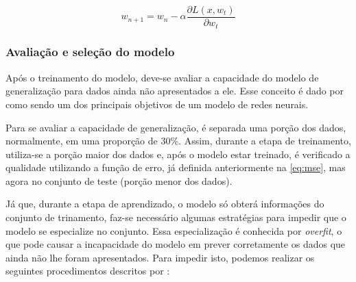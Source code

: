 \documentclass[
    12pt,
    oneside,
    a4paper,
    english,
    brazil
]{abntex2}
\begin{document}
\begin{equation}\label{eq:backpropagation}
    w_{n+1} = w_n - \alpha \frac{\partial L(x,w_t)}{\partial w_t}
\end{equation}

\subsubsection{Avaliação e seleção do modelo}

Após  o treinamento  do  modelo,  deve-se avaliar  a  capacidade  do modelo  de
generalização para dados ainda não apresentados a ele. Esse conceito é dado por
 como sendo um dos  principais objetivos de um modelo de
redes neurais.

Para se avaliar a capacidade de generalização, é separada uma porção dos dados,
normalmente, em uma  proporção de 30\%. Assim, durante a  etapa de treinamento,
utiliza-se  a  porção maior  dos  dados  e, após  o  modelo  estar treinado,  é
verificado a qualidade  utilizando a função de erro,  já definida anteriormente
na \autoref{eq:mse}, mas agora no conjunto de teste (porção menor dos dados).

Já  que, durante  a  etapa  de  aprendizado, o  modelo  só  obterá  informações
do  conjunto  de   trinamento,  faz-se  necessário   algumas  estratégias  para
impedir  que  o  modelo  se  especialize no  conjunto.  Essa  especialização  é
conhecida por \textit{overfit}, o que pode  causar a incapacidade do  modelo em
prever  corretamente  os  dados  que  ainda não  lhe foram  apresentados.  Para
impedir  isto, podemos  realizar   os  seguintes  procedimentos  descritos  por
:
\end{document}
